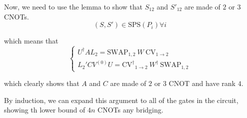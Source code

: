 Now, we need to use the lemma to show that $S_{12}$ and $S'_{12}$ are made of $2$ or $3$ CNOTs.
\begin{equation}
  (S, S') \in \mathrm{SPS}(P_i) \forall i
\end{equation}
  
which means that
\begin{equation}
  \begin{cases} U^\dagger AL_2 = \mathrm{SWAP}_{1,2} ~ W ~ \mathrm{CV}_{1\to 2} \\
    L_2' C V^{(0)} U = \mathrm{CV^\dagger}_{1\to 2} ~ W^\dagger ~ \mathrm{SWAP}_{1,2}
  \end{cases}
\end{equation}

which clearly shows that $A$ and $C$ are made of $2$ or $3$ CNOT and have rank $4$.

By induction, we can expand this argument to all of the gates in the circuit, showing th lower bound of $4n$ CNOTs any bridging.


